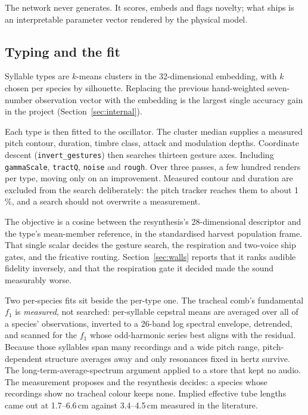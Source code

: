 \documentclass[10pt,twocolumn,a4paper]{article}
\begin{document}
The network never generates. It scores, embeds and flags novelty; what ships is an
interpretable parameter vector rendered by the physical model.

\subsection{Typing and the fit}

Syllable types are $k$-means clusters in the 32-dimensional embedding, with $k$ chosen per
species by silhouette. Replacing the previous hand-weighted seven-number observation vector
with the embedding is the largest single accuracy gain in the project
(Section~\ref{sec:internal}).

Each type is then fitted to the oscillator. The cluster median supplies a measured pitch
contour, duration, timbre class, attack and modulation depths. Coordinate descent
(\texttt{invert\_gestures}) then searches thirteen gesture axes. Including
\texttt{gammaScale}, \texttt{tractQ}, \texttt{noise} and \texttt{rough}. Over three
passes, a few hundred renders per type, moving only on an improvement. Measured contour and
duration are excluded from the search deliberately: the pitch tracker reaches them to about
1\,\%, and a search should not overwrite a measurement.

The objective is a cosine between the resynthesis's 28-dimensional descriptor and the
type's mean-member reference, in the standardised harvest population frame. That single
scalar decides the gesture search, the respiration and two-voice ship gates, and the
fricative routing. Section~\ref{sec:walls} reports that it ranks audible fidelity inversely,
and that the respiration gate it decided made the sound measurably worse.

Two per-species fits sit beside the per-type one. The tracheal comb's fundamental $f_1$ is
\emph{measured}, not searched: per-syllable cepstral means are averaged over all of a
species' observations, inverted to a 26-band log spectral envelope, detrended, and scanned
for the $f_1$ whose odd-harmonic series best aligns with the residual. Because those
syllables span many recordings and a wide pitch range, pitch-dependent structure averages
away and only resonances fixed in hertz survive. The long-term-average-spectrum argument
applied to a store that kept no audio. The measurement proposes and the resynthesis
decides: a species whose recordings show no tracheal colour keeps none. Implied effective
tube lengths came out at 1.7--6.6\,cm against 3.4--4.5\,cm measured in the
literature.
\end{document}
